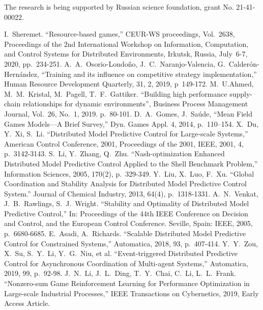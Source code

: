 \documentclass[conference]{IEEEtran}
\begin{document}
The research is being supported by Russian science foundation, grant No. 21-41-00022.

\begin{thebibliography}{999}

     I.~Sheremet. ``Resource-based games,'' CEUR-WS proceedings, Vol.~2638, Proceedings of the 2nd International Workshop on Information, Computation, and Control Systems for Distributed Environments, Irkutsk, Russia, July~6-7, 2020, pp.~234-251.
     A.~A.~Osorio-Londoño, J.~C.~Naranjo-Valencia, G.~Calderón-Hernández, ``Training and its influence on competitive strategy implementation,'' Human Resource Development Quarterly, 31, 2, 2019, p~149-172. 
    M.~U.Ahmed, M.~M.~Kristal, M.~Pagell, T.~F.~Gattiker. ``Building high performance supply-chain relationships for dynamic environments'', Business Process Management Journal, Vol.~26, No.~1, 2019. p.~80-101. 
      D.~A.~Gomes, J.~Saúde, ``Mean Field Games Models—A Brief Survey,'' Dyn. Games Appl. 4, 2014, p.~110–154. 
     X.~Du, Y.~Xi, S.~Li. ``Distributed Model Predictive Control for Large-scale Systems,'' American Control Conference, 2001, Proceedings of the 2001, IEEE, 2001, 4, p.~3142-3143.
     S.~Li, Y.~Zhang, Q.~Zhu. ``Nash-optimization Enhanced Distributed Model Predictive Control Applied to the Shell Benchmark Problem,'' Information Sciences, 2005, 170(2), p.~329-349.
     Y.~Liu, X.~Luo, F.~Xu. ``Global Coordination and Stability Analysis for Distributed Model Predictive Control System.'' Journal of Chemical Industry, 2013, 64(4), p.~1318-1331.
     A.~N.~Venkat, J.~B.~Rawlings, S.~J.~Wright. ``Stability and Optimality of Distributed Model Predictive Control,'' In: Proceedings of the 44th IEEE Conference on Decision and Control, and the European Control Conference. Seville, Spain: IEEE, 2005, p.~6680-6685.
     E.~Asadi, A.~Richards. ``Scalable Distributed Model Predictive Control for Constrained Systems,'' Automatica, 2018, 93, p.~407-414.
     Y.~Y.~Zou, X.~Su, S.~Y.~Li, Y.~G.~Niu, et al. ``Event-triggered Distributed Predictive Control for Asynchronous Coordination of Multi-agent Systems,'' Automatica, 2019, 99, p.~92-98.
     J.~N.~Li, J.~L.~Ding, T.~Y.~Chai, C.~Li, L.~L.~Frank. ``Nonzero-sum Game Reinforcement Learning for Performance Optimization in Large-scale Industrial Processes,'' IEEE Transactions on Cybernetics, 2019, Early Access Article.

\end{thebibliography}
\end{document}
